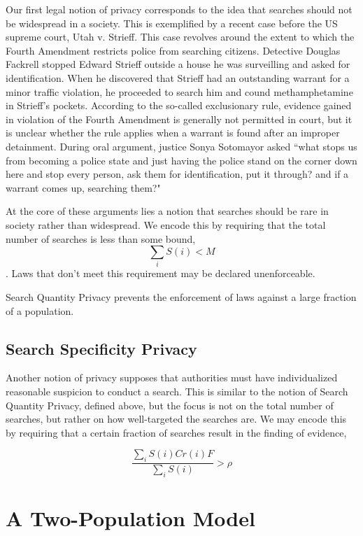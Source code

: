 Our first legal notion of privacy corresponds to the idea that searches should not be widespread in a society.  This is exemplified by a recent case before the US supreme court, Utah v. Strieff.  This case revolves around the extent to which the Fourth Amendment restricts police from searching citizens.  Detective Douglas Fackrell stopped Edward Strieff outside a house he was surveilling and asked for identification.  When he discovered that Strieff had an outstanding warrant for a minor traffic violation, he proceeded to search him and cound methamphetamine in Strieff's pockets.  According to the so-called exclusionary rule, evidence gained in violation of the Fourth Amendment is generally not permitted in court, but it is unclear whether the rule applies when a warrant is found after an improper detainment.  During oral argument, justice Sonya Sotomayor asked ``what stops us from becoming a police state and just having the police stand on the corner down here and stop every person, ask them for identification, put it through? and if a warrant comes up, searching them?"

At the core of these arguments lies a notion that searches should be rare in society rather than widespread.  We encode this by requiring that the total number of searches is less than some bound, $$\sum_i S(i) < M$$.  Laws that don't meet this requirement may be declared unenforceable.

Search Quantity Privacy prevents the enforcement of laws against a large fraction of a population.


\subsection{Search Specificity Privacy}

Another notion of privacy supposes that authorities must have individualized reasonable suspicion to conduct a search.  This is similar to the notion of Search Quantity Privacy, defined above, but the focus is not on the total number of searches, but rather on how well-targeted the searches are.  We may encode this by requiring that a certain fraction of searches result in the finding of evidence,

$$\frac{\sum_i S(i)Cr(i)F}{\sum_i S(i)} > \rho$$




\section{A Two-Population Model}

